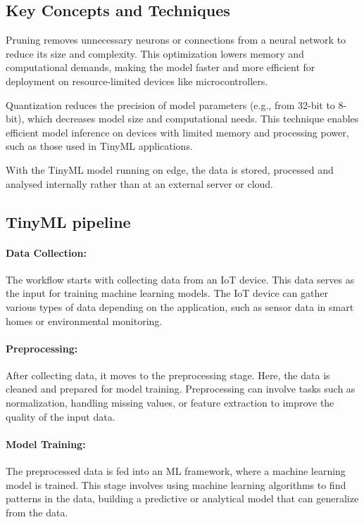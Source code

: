 \documentclass[twocolumn]{article}
\begin{document}
\subsection{Key Concepts and Techniques}

Pruning removes unnecessary neurons or connections from a neural network to reduce its size and complexity. This optimization lowers memory and computational demands, making the model faster and more efficient for deployment on resource-limited devices like microcontrollers.

Quantization reduces the precision of model parameters (e.g., from 32-bit to 8-bit), which decreases model size and computational needs. This technique enables efficient model inference on devices with limited memory and processing power, such as those used in TinyML applications.

With the TinyML model running on edge, the data is stored, processed and analysed internally rather
than at an external server or cloud. 

\subsection{TinyML pipeline}



\paragraph{Data Collection:}
	The workflow starts with collecting data from an IoT device. This data serves as the input for training machine learning models. The IoT device can gather various types of data depending on the application, such as sensor data in smart homes or environmental monitoring. \\[0.10cm]
\paragraph{Preprocessing:}
	After collecting data, it moves to the preprocessing stage. Here, the data is cleaned and prepared for model training. Preprocessing can involve tasks such as normalization, handling missing values, or feature extraction to improve the quality of the input data.\\[0.10cm]
\paragraph{Model Training:}
	The preprocessed data is fed into an ML framework, where a machine learning model is trained. This stage involves using machine learning algorithms to find patterns in the data, building a predictive or analytical model that can generalize from the data.\\[0.10cm]
\end{document}
